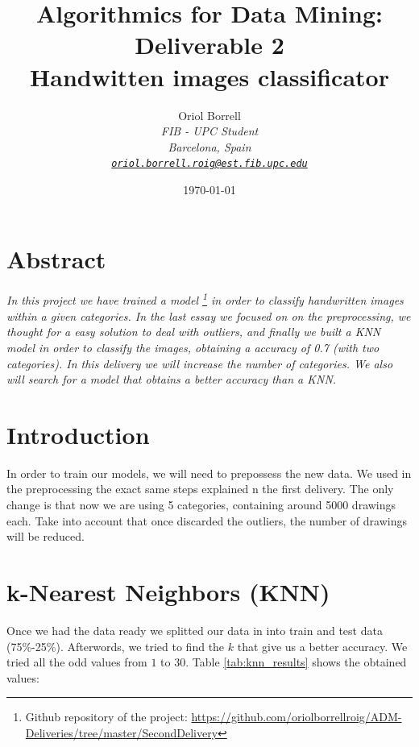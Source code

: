 \documentclass{article}
\title{
\textbf{Algorithmics for Data Mining: Deliverable 2\\} \Large{
    Handwitten images classificator}}
\author{Oriol Borrell\\
\textit{\small FIB - UPC Student} \\
\textit{\small Barcelona, Spain} \\
\textit{\texttt{\href{mailto:oriol.borrell.roig@est.fib.upc.edu}
{\small oriol.borrell.roig@est.fib.upc.edu}}}}
\date{\today}
\begin{document}
\maketitle

\section{Abstract}
\textit{
In this project we have trained a model \footnote{Github repository of the project: \url{https://github.com/oriolborrellroig/ADM-Deliveries/tree/master/SecondDelivery}} in order to classify handwritten images within a given categories. In the last essay we focused on on the preprocessing, we thought for a easy solution to deal with outliers, and finally we built a KNN model in order to classify the images, obtaining a accuracy of 0.7 (with two categories). In this delivery we will increase the number of categories. We also will search for a model that obtains a better accuracy than a KNN.
}

\section{Introduction}
\label{Modeling}
In order to train our models, we will need to prepossess the new data. We used in the preprocessing the exact same steps explained n the first delivery. The only change is that now we are using 5 categories, containing around 5000 drawings each. Take into account that once discarded the outliers, the number of drawings will be reduced. 

\section{k-Nearest Neighbors (KNN)} 
\label{KNN}
Once we had the data ready we splitted our data in into train and test data (75\%-25\%). Afterwords, we tried to find the $k$ that give us a better accuracy. We tried all the odd values from $1$ to $30$. Table \ref{tab:knn_results} shows the obtained values:
\end{document}
